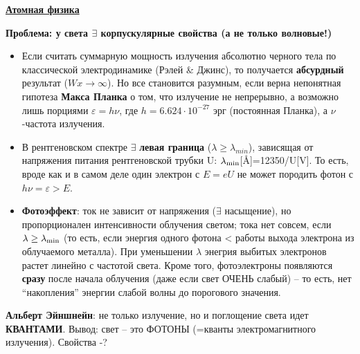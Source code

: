 \documentclass[12pt,epsfig,color,russian]{article}
\begin{document}
\vspace*{-20mm}
 \centerline{\underline{\Large\bf Атомная физика}}\vspace{5mm}

\centerline{\large\bf Проблема: у света $\exists$ корпускулярные свойства
 (а не только волновые!)}
\begin{itemize}
\item Если считать суммарную мощность излучения абсолютно черного тела по классической электродинамике (Рэлей \& Джинс), то получается {\bf абсурдный} результат ($W x\rightarrow\infty$). Но все становится разумным, если верна непонятная гипотеза {\bf Макса Планка} о том, что излучение не непрерывно, а возможно лишь порциями $\varepsilon=h\nu$, где $h=6.624\cdot10^{-27}$ эрг (постоянная Планка), а $\nu$ -частота излучения.
\item В рентгеновском спектре $\exists$ {\bf левая граница} ($\lambda\geq\lambda_{min}$), зависящая от напряжения питания рентгеновской трубки U: $\lambda_{\rm min}$[{\AA}]=12350/U[V]. То есть, вроде как и в самом деле один электрон с $E=eU$ не может породить фотон с $h\nu=\varepsilon>E$.
\item {\bf Фотоэффект}: ток не зависит от напряжения ($\exists$ насыщение), но пропорционален ин\-тен\-сив\-но\-с\-ти облучения светом; тока нет совсем, если $\lambda\geq\lambda_{\rm min}$ (то есть, если энергия одного фотона < работы выхода электрона из облучаемого металла). При уменьшении $\lambda$ энегрия выбитых электронов растет линейно с частотой света. Кроме того, фотоэлектроны появляются {\bf сразу} после начала облучения (даже если свет ОЧЕНЬ слабый) --  то есть, нет ``накопления'' энергии слабой волны до порогового значения.
\end{itemize}
{\bf Альберт Эйншнейн}: не только излучение, но и поглощение света идет {\bf КВАНТАМИ}.
Вывод: свет -- это ФОТОНЫ (=кванты электромагнитного излучения). Свойства -?
\end{document}
